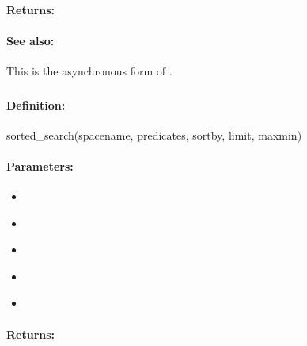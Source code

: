 \paragraph{Returns:}


\paragraph{See also:}  This is the asynchronous form of .

\pagebreak
\subsubsection{}
\label{api:ruby:sorted_search}


\paragraph{Definition:}
\begin{rubycode}
sorted_search(spacename, predicates, sortby, limit, maxmin)
\end{rubycode}

\paragraph{Parameters:}
\begin{itemize}[noitemsep]
\item {}\\

\item {}\\

\item {}\\

\item {}\\

\item {}\\

\end{itemize}

\paragraph{Returns:}


